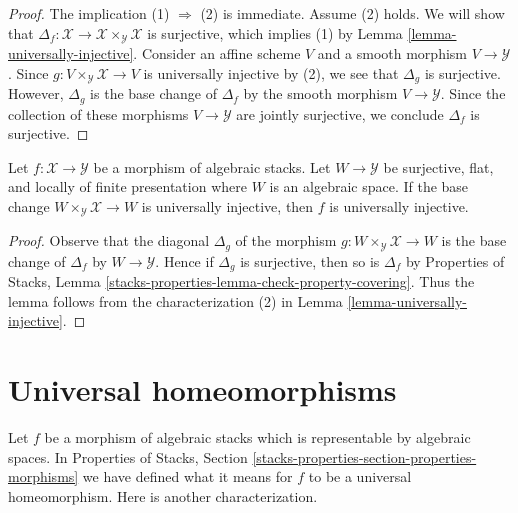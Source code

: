 \begin{proof}
The implication (1) $\Rightarrow$ (2) is immediate.
Assume (2) holds. We will show that
$\Delta_f : \mathcal{X} \to \mathcal{X} \times_\mathcal{Y} \mathcal{X}$
is surjective, which implies (1) by Lemma \ref{lemma-universally-injective}.
Consider an affine scheme $V$ and a smooth morphism
$V \to \mathcal{Y}$. Since
$g : V \times_\mathcal{Y} \mathcal{X} \to V$
is universally injective by (2), we see that
$\Delta_g$ is surjective.
However, $\Delta_g$ is the base change of $\Delta_f$
by the smooth morphism $V \to \mathcal{Y}$.
Since the collection of these morphisms $V \to \mathcal{Y}$
are jointly surjective, we conclude $\Delta_f$ is surjective.
\end{proof}

\begin{lemma}
\label{lemma-check-universally-injective-covering}
Let $f : \mathcal{X} \to \mathcal{Y}$ be a morphism of algebraic stacks.
Let $W \to \mathcal{Y}$ be surjective, flat, and locally of finite
presentation where $W$ is an algebraic space. If the base change
$W \times_\mathcal{Y} \mathcal{X} \to W$ is universally injective,
then $f$ is universally injective.
\end{lemma}

\begin{proof}
Observe that the diagonal $\Delta_g$ of the morphism
$g : W \times_\mathcal{Y} \mathcal{X} \to W$
is the base change of $\Delta_f$ by $W \to \mathcal{Y}$.
Hence if $\Delta_g$ is surjective, then so is $\Delta_f$
by Properties of Stacks, Lemma
\ref{stacks-properties-lemma-check-property-covering}.
Thus the lemma follows from the characterization (2)
in Lemma \ref{lemma-universally-injective}.
\end{proof}








\section{Universal homeomorphisms}
\label{section-universal-homeomorphisms}

\noindent
Let $f$ be a morphism of algebraic stacks which is representable by
algebraic spaces. In
Properties of Stacks, Section
\ref{stacks-properties-section-properties-morphisms}
we have defined what it means for $f$ to be a universal homeomorphism.
Here is another characterization.

